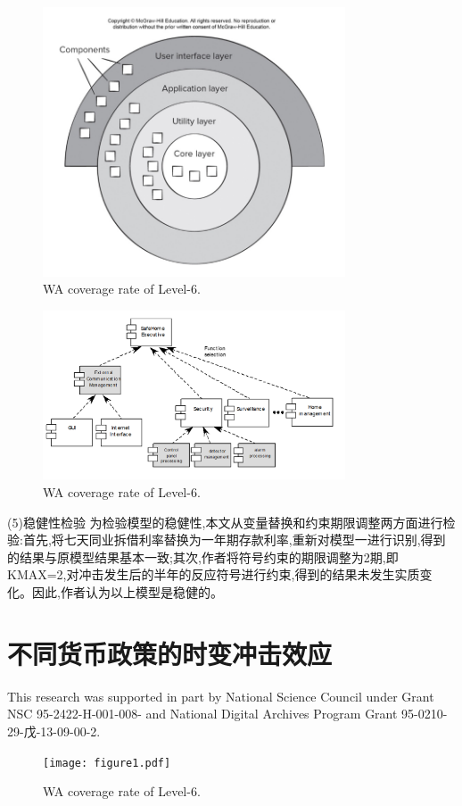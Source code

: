 \documentclass{ijclclp}
\begin{document}
\begin{figure}[h]
    \centering
    \includegraphics[width=0.8\textwidth]{img/图9.png}
    \caption{WA coverage rate of Level-6.}
\end{figure}
\begin{figure}[h]
    \centering
    \includegraphics[width=0.8\textwidth]{img/图10.png}
    \caption{WA coverage rate of Level-6.}
\end{figure}

(5)稳健性检验
为检验模型的稳健性,本文从变量替换和约束期限调整两方面进行检验:首先,将七天同业拆借利率替换为一年期存款利率,重新对模型一进行识别,得到的结果与原模型结果基本一致;其次,作者将符号约束的期限调整为2期,即KMAX=2,对冲击发生后的半年的反应符号进行约束,得到的结果未发生实质变化。因此,作者认为以上模型是稳健的。

\section{不同货币政策的时变冲击效应}
This research was supported in part by National Science Council under Grant NSC 95-2422-H-001-008- and National Digital Archives Program Grant 95-0210-29-戊-13-09-00-2.


\begin{figure}[h]
    \centering
    \texttt{[image: figure1.pdf]}
    \caption{WA coverage rate of Level-6.}
\end{figure}
\end{document}

